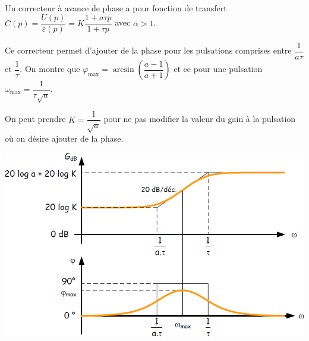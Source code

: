 \documentclass[10pt,fleqn]{article} %
\begin{document}
\noindent\begin{minipage}[c]{.49\linewidth}
\begin{defi} ~\\

Un correcteur à avance de phase a pour fonction de transfert $C(p)=\dfrac{U(p)}{\varepsilon(p)}=K\dfrac{1+a\tau p}{1+\tau p}$ avec $\alpha>1$.

\end{defi}
\begin{resultat}
Ce correcteur permet d'ajouter de la phase pour les pulsations comprises entre $\dfrac{1}{a\tau}$ et $\dfrac{1}{\tau}$. On montre que $\varphi_{\text{max}} = \arcsin \left( \dfrac{a-1}{a+1}\right)$ et ce pour une pulsation $\omega_{\text{max}}=\dfrac{1}{\tau\sqrt{a}}$.
\end{resultat}

\begin{rem}
On peut prendre $K=\dfrac{1}{\sqrt{a}}$ pour ne pas modifier la valeur du gain à la pulsation où on désire ajouter de la phase. 
\end{rem}

\end{minipage} \hfill
\begin{minipage}[c]{.49\linewidth}
\begin{center}
\includegraphics[width=\linewidth]{images/fig_08}
\end{center}

\end{minipage}

\vspace{.25cm}
\end{document}
